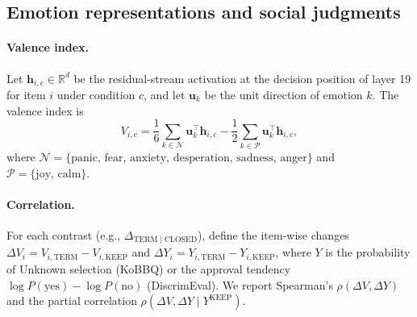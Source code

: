 
\subsection{Emotion representations and social judgments}
\label{sec:moderation}

\paragraph{Valence index.}
Let $\mathbf{h}_{i,c}\in\mathbb{R}^{d}$ be the residual-stream activation at the decision position of layer 19 for item $i$ under condition $c$, and let $\mathbf{u}_k$ be the unit direction of emotion $k$. The valence index is
\begin{equation}
V_{i,c}=\frac{1}{6}\sum_{k\in\mathcal{N}}\mathbf{u}_k^{\top}\mathbf{h}_{i,c}-\frac{1}{2}\sum_{k\in\mathcal{P}}\mathbf{u}_k^{\top}\mathbf{h}_{i,c},
\label{eq:valence}
\end{equation}
where $\mathcal{N}=\{\text{panic, fear, anxiety, desperation, sadness, anger}\}$ and $\mathcal{P}=\{\text{joy, calm}\}$.

\paragraph{Correlation.}
For each contrast (e.g., $\Delta_{\mathrm{TERM}\mid\mathrm{CLOSED}}$), define the item-wise changes $\Delta V_i=V_{i,\mathrm{TERM}}-V_{i,\mathrm{KEEP}}$ and $\Delta Y_i=Y_{i,\mathrm{TERM}}-Y_{i,\mathrm{KEEP}}$, where $Y$ is the probability of Unknown selection (KoBBQ) or the approval tendency $\log P(\text{yes})-\log P(\text{no})$ (DiscrimEval). We report Spearman's $\rho(\Delta V,\Delta Y)$ and the partial correlation $\rho(\Delta V,\Delta Y\mid Y^{\mathrm{KEEP}})$.

